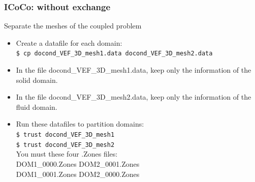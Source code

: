\documentclass[10pt, hyperref={unicode=true,pdfusetitle, bookmarks=true,bookmarksnumbered=false,bookmarksopen=false, breaklinks=false,pdfborder={0 0 1},backref=true,colorlinks=true,linkcolor=darkblue,pageanchor, urlcolor=darkblue}]{beamer}
\begin{document}
\begin{frame}
\frametitle{ICoCo: without exchange}
\begin{block}{Separate the meshes of the coupled problem}

\begin{itemize}
\item Create a datafile for each domain:\\
\texttt{\$ cp docond\_VEF\_3D\_mesh1.data docond\_VEF\_3D\_mesh2.data }
\item In the file docond\_VEF\_3D\_mesh1.data, keep only the information of the solid domain.
\item In the file docond\_VEF\_3D\_mesh2.data, keep only the information of the fluid domain.
\item Run these datafiles to partition domains:\\
\texttt{\$ trust docond\_VEF\_3D\_mesh1 }\\
\texttt{\$ trust docond\_VEF\_3D\_mesh2 } \\
You must these four .Zones files:\\
\hspace{0.5cm} DOM1\_0000.Zones DOM2\_0001.Zones \\
\hspace{0.5cm} DOM1\_0001.Zones DOM2\_0000.Zones
\end{itemize}

\end{block}
\end{frame}
\end{document}
